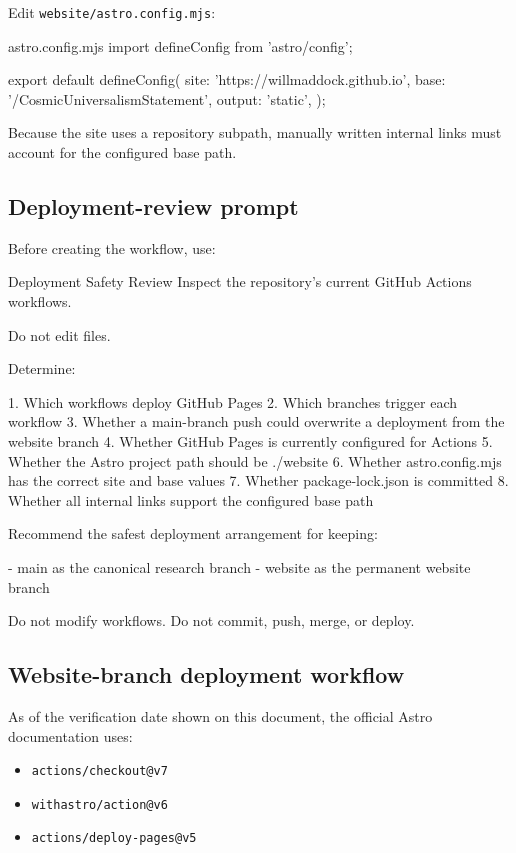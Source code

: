 \documentclass[11pt,letterpaper]{article}
\newcommand{\filepath}[1]{\texttt{#1}}
\begin{document}
Edit \filepath{website/astro.config.mjs}:

\begin{codebox}{astro.config.mjs}
import { defineConfig } from 'astro/config';

export default defineConfig({
  site: 'https://willmaddock.github.io',
  base: '/CosmicUniversalismStatement',
  output: 'static',
});
\end{codebox}

Because the site uses a repository subpath, manually written internal
links must account for the configured base path.

\subsection{Deployment-review prompt}

Before creating the workflow, use:

\begin{promptbox}{Deployment Safety Review}
Inspect the repository's current GitHub Actions workflows.

Do not edit files.

Determine:

1. Which workflows deploy GitHub Pages
2. Which branches trigger each workflow
3. Whether a main-branch push could overwrite a deployment from
   the website branch
4. Whether GitHub Pages is currently configured for Actions
5. Whether the Astro project path should be ./website
6. Whether astro.config.mjs has the correct site and base values
7. Whether package-lock.json is committed
8. Whether all internal links support the configured base path

Recommend the safest deployment arrangement for keeping:

- main as the canonical research branch
- website as the permanent website branch

Do not modify workflows.
Do not commit, push, merge, or deploy.
\end{promptbox}

\subsection{Website-branch deployment workflow}

As of the verification date shown on this document, the official Astro
documentation uses:

\begin{itemize}
    \item \texttt{actions/checkout@v7}
    \item \texttt{withastro/action@v6}
    \item \texttt{actions/deploy-pages@v5}
\end{itemize}
\end{document}
